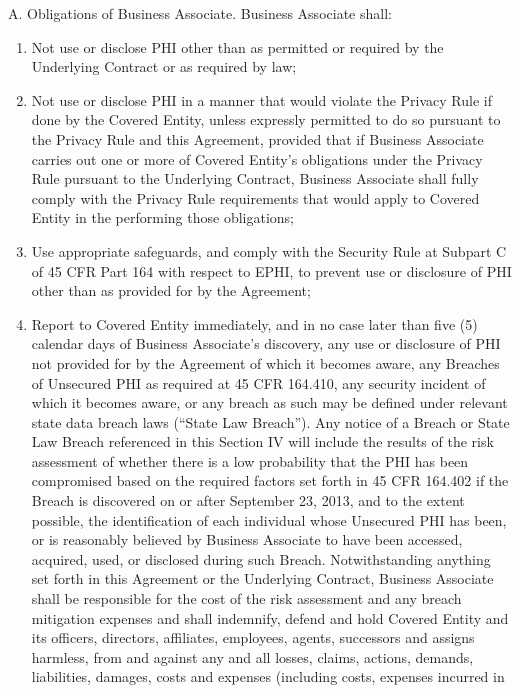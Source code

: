 \documentclass[11pt,a4paper]{article} %
\begin{document}
A. Obligations of Business Associate. Business Associate shall:

\begin{enumerate}
\def\labelenumi{\arabic{enumi}.}
\item
  Not use or disclose PHI other than as permitted or required by the
  Underlying Contract or as required by law;
\item
  Not use or disclose PHI in a manner that would violate the Privacy
  Rule if done by the Covered Entity, unless expressly permitted to do
  so pursuant to the Privacy Rule and this Agreement, provided that if
  Business Associate carries out one or more of Covered Entity's
  obligations under the Privacy Rule pursuant to the Underlying
  Contract, Business Associate shall fully comply with the Privacy Rule
  requirements that would apply to Covered Entity in the performing
  those obligations;
\item
  Use appropriate safeguards, and comply with the Security Rule at
  Subpart C of 45 CFR Part 164 with respect to EPHI, to prevent use or
  disclosure of PHI other than as provided for by the Agreement;
\item
  Report to Covered Entity immediately, and in no case later than five
  (5) calendar days of Business Associate's discovery, any use or
  disclosure of PHI not provided for by the Agreement of which it
  becomes aware, any Breaches of Unsecured PHI as required at 45 CFR
  164.410, any security incident of which it becomes aware, or any
  breach as such may be defined under relevant state data breach laws
  (``State Law Breach''). Any notice of a Breach or State Law Breach
  referenced in this Section IV will include the results of the risk
  assessment of whether there is a low probability that the PHI has been
  compromised based on the required factors set forth in 45 CFR 164.402
  if the Breach is discovered on or after September 23, 2013, and to the
  extent possible, the identification of each individual whose Unsecured
  PHI has been, or is reasonably believed by Business Associate to have
  been accessed, acquired, used, or disclosed during such Breach.
  Notwithstanding anything set forth in this Agreement or the Underlying
  Contract, Business Associate shall be responsible for the cost of the
  risk assessment and any breach mitigation expenses and shall
  indemnify, defend and hold Covered Entity and its officers, directors,
  affiliates, employees, agents, successors and assigns harmless, from
  and against any and all losses, claims, actions, demands, liabilities,
  damages, costs and expenses (including costs, expenses incurred in

\end{enumerate}
\end{document}

